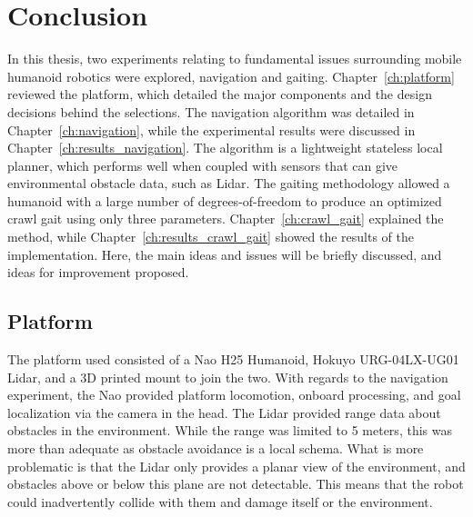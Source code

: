 \chapter{Conclusion} \label{ch:conclusion}
In this thesis, two experiments relating to fundamental issues surrounding
mobile humanoid robotics were explored, navigation and gaiting.
Chapter~\ref{ch:platform} reviewed the platform, which detailed the major 
components and the design decisions behind the selections.
The navigation algorithm was detailed in Chapter~\ref{ch:navigation}, while the
experimental results were discussed in Chapter~\ref{ch:results_navigation}.
The algorithm is a lightweight stateless local planner, which performs well when
coupled with sensors that can give environmental obstacle data, such as Lidar.
The gaiting methodology allowed a humanoid with a large number of
degrees-of-freedom to produce an optimized crawl gait using only three
parameters. Chapter~\ref{ch:crawl_gait} explained the method, while
Chapter~\ref{ch:results_crawl_gait} showed the results of the implementation.
Here, the main ideas and issues will be briefly discussed, and ideas for
improvement proposed.

\section{Platform}
The platform used consisted of a Nao H25 Humanoid, Hokuyo URG-04LX-UG01 Lidar, 
and a 3D printed mount to join the two. With regards to the navigation 
experiment, the Nao provided platform locomotion, onboard processing, and goal 
localization via the camera in the head. The Lidar provided range data about
obstacles in the environment. While the range was limited to 5 meters, this
was more than adequate as obstacle avoidance is a local schema. What is more
problematic is that the Lidar only provides a planar view of the environment,
and obstacles above or below this plane are not detectable.
This means that the robot could inadvertently collide with them and damage
itself or the environment.

